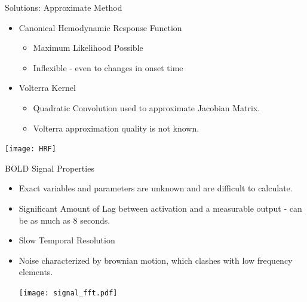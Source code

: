 \documentclass{beamer}
\begin{document}
\begin{frame}{Solutions: Approximate Method}
  \begin{itemize}
    \item Canonical Hemodynamic Response Function
    \begin{itemize}
        \item Maximum Likelihood Possible
        \item Inflexible - even to changes in onset time
    \end{itemize}
    
    \item Volterra Kernel 
    \begin{itemize}
        \item Quadratic Convolution used to approximate Jacobian Matrix.
        \item Volterra approximation quality is not known.
    \end{itemize}
  \end{itemize}
    \begin{center}
    \texttt{[image: HRF]}
    \end{center}
\end{frame}

\begin{frame}{BOLD Signal Properties}
  \begin{itemize}
    \item Exact variables and parameters are unknown and are
        difficult to calculate.
    \item Significant Amount of Lag between activation
        and a measurable output - can be as much as 8 seconds.
    \item Slow Temporal Resolution
    \item Noise characterized by brownian motion, which clashes with low 
        frequency elements.
    \begin{center}
    \texttt{[image: signal\_fft.pdf]}
    \end{center}
  \end{itemize}
\end{frame}
\end{document}
